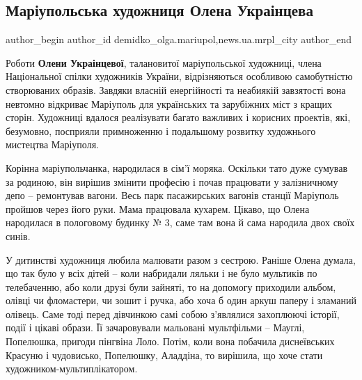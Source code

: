  
 
 
 
 
 
\subsection{Маріупольська художниця Олена Украінцева}
\label{sec:16_04_2019.stz.news.ua.mrpl_city.1.mrpl_hudozhnycja_olena_ukrainceva}
 
\ifcmt
 author_begin
   author_id demidko_olga.mariupol,news.ua.mrpl_city
 author_end
\fi


Роботи \textbf{Олени Украінцевої}, талановитої маріупольської художниці, члена
Національної спілки художників України, відрізняються особливою самобутністю
створюваних образів. Завдяки власній енергійності та неабиякій завзятості вона
невтомно відкриває Маріуполь для українських та зарубіжних міст з кращих
сторін. Художниці вдалося реалізувати багато важливих і корисних проектів, які,
безумовно, посприяли примноженню і подальшому розвитку художнього мистецтва
Маріуполя.

Корінна маріупольчанка, народилася в сім'ї моряка. Оскільки тато дуже сумував
за родиною, він вирішив змінити професію і почав працювати у залізничному депо
– ремонтував вагони. Весь парк пасажирських вагонів станції Маріуполь пройшов
через його руки. Мама працювала кухарем. Цікаво, що Олена народилася в
пологовому будинку № 3, саме там вона й сама народила двох своїх синів.


У дитинстві художниця любила малювати разом з сестрою. Раніше Олена думала, що
так було у всіх дітей – коли набридали ляльки і не було мультиків по
телебаченню, або коли друзі були зайняті, то на допомогу приходили альбом,
олівці чи фломастери, чи зошит і ручка, або хоча б один аркуш паперу і зламаний
олівець. Саме тоді перед дівчинкою самі собою з'являлися захоплюючі історії,
події і цікаві образи. Її зачаровували мальовані мультфільми – Мауглі,
Попелюшка, пригоди пінгвіна Лоло. Потім, коли вона побачила диснеївських
Красуню і чудовисько, Попелюшку, Аладдіна, то вирішила, що хоче стати
художником-мультиплікатором.

